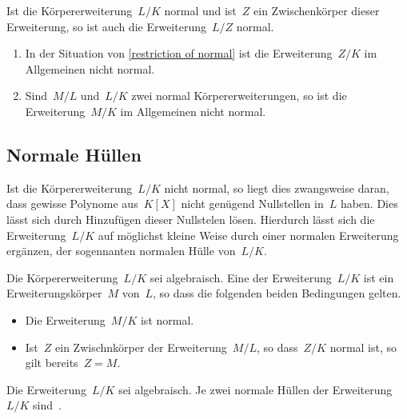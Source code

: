 \begin{proposition}
  \label{restriction of normal}
  Ist die Körpererweiterung~$L/K$ normal und ist~$Z$ ein Zwischenkörper dieser Erweiterung, so ist auch die Erweiterung~$L/Z$ normal.
\end{proposition}

\begin{warning}
  \leavevmode
  \begin{enumerate}
    \item
      In der Situation von \cref{restriction of normal} ist die Erweiterung~$Z/K$ im Allgemeinen nicht normal.
    \item
      Sind~$M/L$ und~$L/K$ zwei normal Körpererweiterungen, so ist die Erweiterung~$M/K$ im Allgemeinen nicht normal.
  \end{enumerate}
\end{warning}



\subsection{Normale Hüllen}

Ist die Körpererweiterung~$L/K$ nicht normal, so liegt dies zwangsweise daran, dass gewisse Polynome aus~$K[X]$ nicht genügend Nullstellen in~$L$ haben.
Dies lässt sich durch Hinzufügen dieser Nullstelen lösen.
Hierdurch lässt sich die Erweiterung~$L/K$ auf möglichst kleine Weise durch einer normalen Erweiterung ergänzen, der sogennanten normalen Hülle von~$L/K$.

\begin{definition}
  Die Körpererweiterung~$L/K$ sei algebraisch.
  Eine  der Erweiterung~$L/K$ ist ein Erweiterungskörper~$M$ von~$L$, so dass die folgenden beiden Bedingungen gelten.
  \begin{itemize}
    \item
      Die Erweiterung~$M/K$ ist normal.
    \item
      Ist~$Z$ ein Zwischnkörper der Erweiterung~$M/L$, so dass~$Z/K$ normal ist, so gilt bereits~$Z = M$.
  \end{itemize}
\end{definition}

\begin{proposition}
  Die Erweiterung~$L/K$ sei algebraisch.
  Je zwei normale Hüllen der Erweiterung~$L/K$ sind~.
\end{proposition}





